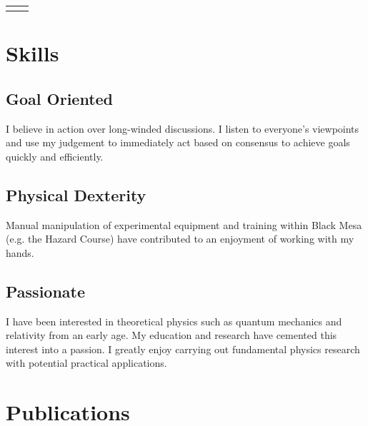 \documentclass[
    10pt, %
]{FreemanCV}
\begin{document}
\begin{paracol}{2}
\begin{supertabular}{r l}



\end{supertabular}


\section{Skills}

\subsection{Goal Oriented}

I believe in action over long-winded discussions. I listen to everyone's viewpoints and use my judgement to immediately act based on consensus to achieve goals quickly and efficiently.

\subsection{Physical Dexterity}

Manual manipulation of experimental equipment and training within Black Mesa (e.g. the Hazard Course) have contributed to an enjoyment of working with my hands.

\subsection{Passionate}

I have been interested in theoretical physics such as quantum mechanics and relativity from an early age. My education and research have cemented this interest into a passion. I greatly enjoy carrying out fundamental physics research with potential practical applications.


\section{Publications}


\end{paracol}
\end{document}
